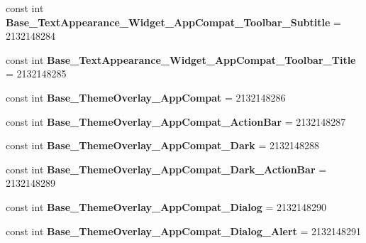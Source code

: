 \begin{DoxyCompactItemize}
\mbox{\label{classst_delivery_1_1_resource_1_1_style_ab5d03afa22fcd2f4cf6e1bed975bd9bb}} 
const int {\bfseries Base\+\_\+\+Text\+Appearance\+\_\+\+Widget\+\_\+\+App\+Compat\+\_\+\+Toolbar\+\_\+\+Subtitle} = 2132148284
\item 
\mbox{\label{classst_delivery_1_1_resource_1_1_style_a81e1179b548cceae1f9a8b174cced43b}} 
const int {\bfseries Base\+\_\+\+Text\+Appearance\+\_\+\+Widget\+\_\+\+App\+Compat\+\_\+\+Toolbar\+\_\+\+Title} = 2132148285
\item 
\mbox{\label{classst_delivery_1_1_resource_1_1_style_a484c781550c61c9ee2a48a06d54603b2}} 
const int {\bfseries Base\+\_\+\+Theme\+Overlay\+\_\+\+App\+Compat} = 2132148286
\item 
\mbox{\label{classst_delivery_1_1_resource_1_1_style_a541316ba2417693f520cc5ec4539f601}} 
const int {\bfseries Base\+\_\+\+Theme\+Overlay\+\_\+\+App\+Compat\+\_\+\+Action\+Bar} = 2132148287
\item 
\mbox{\label{classst_delivery_1_1_resource_1_1_style_ae7481a1032fca308582a3cf79d805580}} 
const int {\bfseries Base\+\_\+\+Theme\+Overlay\+\_\+\+App\+Compat\+\_\+\+Dark} = 2132148288
\item 
\mbox{\label{classst_delivery_1_1_resource_1_1_style_aa483f144b66e26268ad2303fa603d475}} 
const int {\bfseries Base\+\_\+\+Theme\+Overlay\+\_\+\+App\+Compat\+\_\+\+Dark\+\_\+\+Action\+Bar} = 2132148289
\item 
\mbox{\label{classst_delivery_1_1_resource_1_1_style_ade4dda9b60600c3bb9dfd186db5caa98}} 
const int {\bfseries Base\+\_\+\+Theme\+Overlay\+\_\+\+App\+Compat\+\_\+\+Dialog} = 2132148290
\item 
\mbox{\label{classst_delivery_1_1_resource_1_1_style_ab66ce2f626ece3474ed2a001e28cd133}} 
const int {\bfseries Base\+\_\+\+Theme\+Overlay\+\_\+\+App\+Compat\+\_\+\+Dialog\+\_\+\+Alert} = 2132148291
\item 

\end{DoxyCompactItemize}
